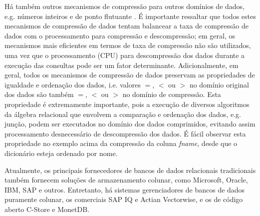Há também outros mecanismos de compressão para outros domínios de dados, e.g. números inteiros e de ponto 
flutuante \cite{Abadi2006, Zukowski2006}. É importante ressaltar que todos estes mecanismos de 
compressão de dados tentam balancear a taxa de compressão de dados com o processamento para compressão
e descompressão; em geral, os mecanismos mais eficientes em termos de taxa de compressão não são utilizados,
uma vez que o processamento (CPU) para descompressão dos dados durante a execução das consultas
pode ser um fator determinante. Adicionalmente, em geral, todos os mecanismos de compressão de dados
preservam as propriedades de igualdade e ordenação dos dados, i.e. valores $=$, $<$ ou $>$ no domínio original
dos dados são também $=$, $<$ ou $>$ no domínio de compressão. Esta propriedade é extremamente importante, 
pois a execução de diversos algoritmos da álgebra relacional que envolvem a comparação e ordenação dos
dados, e.g. junção, podem ser executados no domínio dos dados comprimidos, evitando assim processamento 
desnecessário de descompressão dos dados. É fácil observar esta propriedade no exemplo acima da compressão
da coluna \emph{fname}, desde que o dicionário esteja ordenado por nome.

Atualmente, os principais fornecedores de bancos de dados relacionais tradicionais também fornecem 
soluções de armazenamento colunar, como Microsoft, Oracle, IBM, SAP e outros. Entretanto, há sistemas
gerenciadores de bancos de dados puramente colunar, os comerciais SAP IQ e Actian Vectorwise, e os
de código aberto C-Store e MonetDB.
  

